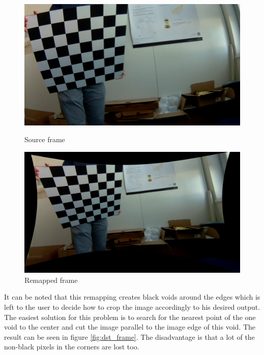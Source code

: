 \newpage
\begin{figure}[H]
     \centering
     \captionsetup{justification=centering}
     \begin{minipage}[c]{0.5\textwidth}
        \centering
        \includegraphics[width=.95\textwidth]{image/2/undist_og.png}
        \caption{Source frame}
        \label{fig:map_og}
     \end{minipage}%
     \begin{minipage}[c]{0.5\textwidth}
        \centering
        \includegraphics[width=.95\textwidth]{image/2/undist_without_roi.png}
        \caption{Remapped frame}
        \label{fig:map_remap}
     \end{minipage}
\end{figure}


It can be noted that this remapping creates black voids around the edges which is left to the user to decide how to crop the image accordingly to his desired output.
The easiest solution for this problem is to search for the nearest point of the one void to the center and cut the image parallel to the image edge of this void. The result can be seen in figure \ref{fig:dst_frame}. The disadvantage is that a lot of the non-black pixels in the corners are lost too. \\



